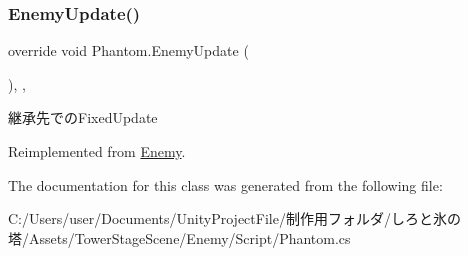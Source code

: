 \subsubsection{\texorpdfstring{Enemy\+Update()}{EnemyUpdate()}}
{\footnotesize\ttfamily override void Phantom.\+Enemy\+Update (\begin{DoxyParamCaption}{ }\end{DoxyParamCaption})\hspace{0.3cm}{\ttfamily [inline]}, {\ttfamily [protected]}, {\ttfamily [virtual]}}



継承先での\+Fixed\+Update 



Reimplemented from \hyperlink{class_enemy_ab19a73003a5b443ba93f4b6a45c0abad}{Enemy}.



The documentation for this class was generated from the following file\+:\begin{DoxyCompactItemize}
\item 
C\+:/\+Users/user/\+Documents/\+Unity\+Project\+File/制作用フォルダ/しろと氷の塔/\+Assets/\+Tower\+Stage\+Scene/\+Enemy/\+Script/Phantom.\+cs\end{DoxyCompactItemize}
